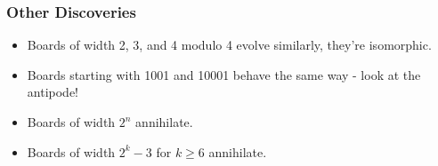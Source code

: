 \documentclass[10pt]{beamer}
\begin{document}
\begin{frame}
  \frametitle{Other Discoveries}
  \begin{itemize}
    \item Boards of width 2, 3, and 4 modulo 4 evolve similarly, they're isomorphic.
    \item Boards starting with 1001 and 10001 behave the same way - look at the antipode!
    \item Boards of width $2^n$ annihilate.
    \item Boards of width $2^k-3$ for $k\geq 6$ annihilate.
  \end{itemize}
\end{frame}
\end{document}
